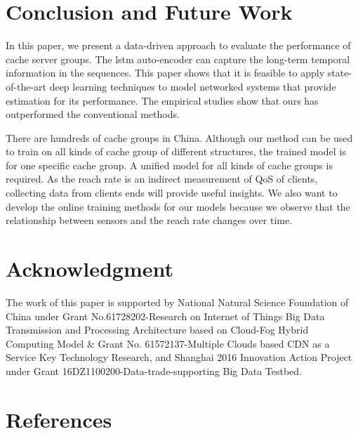 \documentclass[5p]{elsarticle}
\begin{document}
\section{Conclusion and Future Work}

In this paper, we present a data-driven approach to evaluate the performance of cache server groups. The lstm auto-encoder can capture the long-term temporal information in the sequences. This paper shows that it is feasible to apply state-of-the-art deep learning techniques to model networked systems that provide estimation for its performance. The empirical studies show that ours has outperformed the conventional methods.

There are hundreds of cache groups in China. Although our method can be used to train on all kinds of cache group of different structures, the trained model is for one specific cache group. A unified model for all kinds of cache groups is required. As the reach rate is an indirect measurement of QoS of clients, collecting data from clients ends will provide useful insights. We also want to develop the online training methods for our models because we observe that the relationship between sensors and the reach rate changes over time.

\section{Acknowledgment}
The work of this paper is supported by National Natural Science Foundation of China under Grant No.61728202-Research on Internet of Things Big Data Transmission and Processing Architecture based on Cloud-Fog Hybrid Computing Model & Grant No. 61572137-Multiple Clouds based CDN as a Service Key Technology Research, and Shanghai 2016 Innovation Action Project under Grant 16DZ1100200-Data-trade-supporting Big Data Testbed.


\section*{References}


\end{document}
